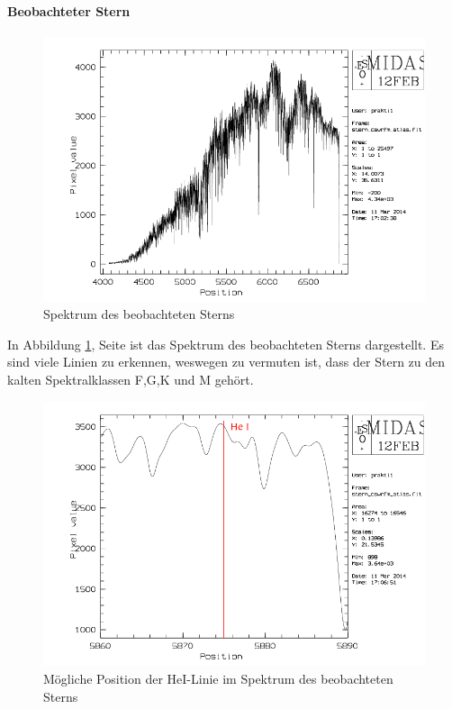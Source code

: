 \paragraph{Beobachteter Stern}
\begin{figure}
\includegraphics[height=.4\textheight]{images/stern_messung_spektrum.png}
\caption{Spektrum des beobachteten Sterns}
\label{fig:stern_messung_spektrum}
\end{figure}
In Abbildung \ref{fig:stern_messung_spektrum}, Seite \pageref{fig:stern_messung_spektrum} ist das Spektrum des beobachteten Sterns dargestellt. Es sind viele Linien zu erkennen, weswegen zu vermuten ist, dass der Stern zu den kalten Spektralklassen F,G,K und M gehört.
\\
\begin{figure}
\includegraphics[height=.4\textheight]{images/stern_messung_HeI.png}
\caption{Mögliche Position der HeI-Linie im Spektrum des beobachteten Sterns}
\label{fig:stern_messung_HeI}
\end{figure}
